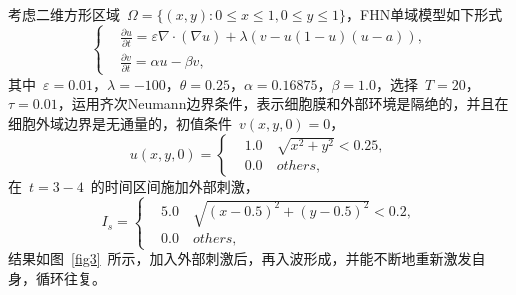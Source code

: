 \documentclass[twoside,UTF8]{nputhesis}
\begin{document}
考虑二维方形区域~$\Omega=\{(x,y):0\leq x\leq1, 0\leq y\leq1\}$，FHN单域模型如下形式\cite{Ying2005}
\begin{equation*}
\left\{\begin{aligned}&\frac{\partial u}{\partial t}=\varepsilon\nabla\cdot(\nabla u)+\lambda(v-u(1-u)(u-a)),\\
&\frac{\partial v}{\partial t}=\alpha u-\beta v,\end{aligned}\right.
\end{equation*}
其中~$\varepsilon=0.01$，$\lambda=-100$，$\theta=0.25$，$\alpha=0.16875$，$\beta=1.0$，选择~$T=20$，$\tau=0.01$，运用齐次Neumann边界条件，表示细胞膜和外部环境是隔绝的，并且在细胞外域边界是无通量的，初值条件~$v(x,y,0)=0$，
\begin{equation*}
u(x,y,0)=\left\{\begin{aligned}&1.0 \quad\sqrt{x^2+y^2}<0.25,\\
&0.0 \quad others,\end{aligned}\right.
\end{equation*}
在~$t=3-4$~的时间区间施加外部刺激，
\begin{equation*}
I_s=\left\{\begin{aligned}&5.0 \quad\sqrt{(x-0.5)^2+(y-0.5)^2}<0.2,\\
&0.0 \quad others,\end{aligned}\right.
\end{equation*}
结果如图~\ref{fig3}~所示，加入外部刺激后，再入波形成，并能不断地重新激发自身，循环往复。
\end{document}
